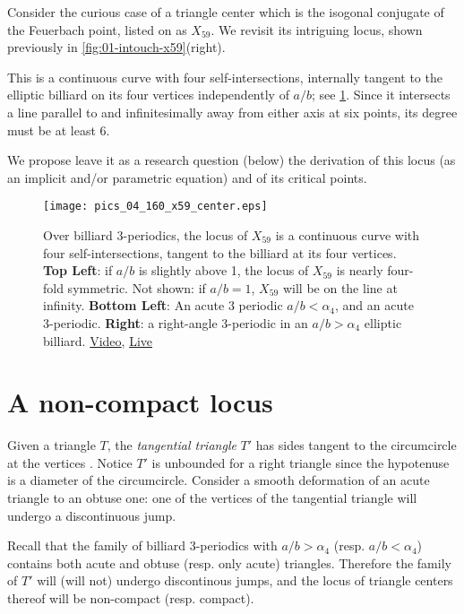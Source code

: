 Consider the curious case of a triangle center which is the isogonal conjugate of the Feuerbach point, listed on \cite{etc} as $X_{59}$. We revisit its intriguing locus, shown previously in \cref{fig:01-intouch-x59}(right).

This is a continuous curve with four self-intersections, internally tangent to the elliptic billiard on its four vertices independently of $a/b$; see \cref{fig:04-x59-locus}. Since it intersects a line parallel to and infinitesimally away from either axis at six points, its degree must be at least 6.

We propose leave it as a research question (below) the derivation of this locus (as an implicit and/or parametric equation) and of its critical points. 

\begin{figure}
    \centering
    \texttt{[image: pics\_04\_160\_x59\_center.eps]}
    \caption{Over billiard 3-periodics, the locus of $X_{59}$ is a continuous curve with four self-intersections, tangent to the billiard at its four vertices. \textbf{Top Left}: if $a/b$ is slightly above 1, the locus of  $X_{59}$ is nearly four-fold symmetric. Not shown: if $a/b=1$, $X_{59}$ will be on the line at infinity. \textbf{Bottom Left}: An acute 3 periodic $a/b<\alpha_4$, and an acute 3-periodic. \textbf{Right}: a right-angle 3-periodic in an $a/b>\alpha_4$ elliptic billiard. \href{https://youtu.be/pl_PqSuhlx0}{Video}, \href{https://bit.ly/3fvDlZd}{Live}}
    \label{fig:04-x59-locus}
\end{figure}


\section{A non-compact locus}

Given a triangle $T$, the {\em tangential triangle} $T'$ has sides tangent to the circumcircle at the vertices \cite[Tangential triangle]{mw}. Notice $T'$ is unbounded for a right triangle since the hypotenuse is a diameter of the circumcircle. Consider a smooth deformation of an acute triangle to an obtuse one: one of the vertices of the tangential triangle will undergo a discontinuous jump.

Recall that the family of billiard 3-periodics with $a/b>\alpha_4$ (resp. $a/b<\alpha_4$) contains both acute and obtuse (resp. only acute) triangles. Therefore the family of $T'$ will (will not) undergo discontinous jumps, and the locus of triangle centers thereof will be non-compact (resp. compact).

